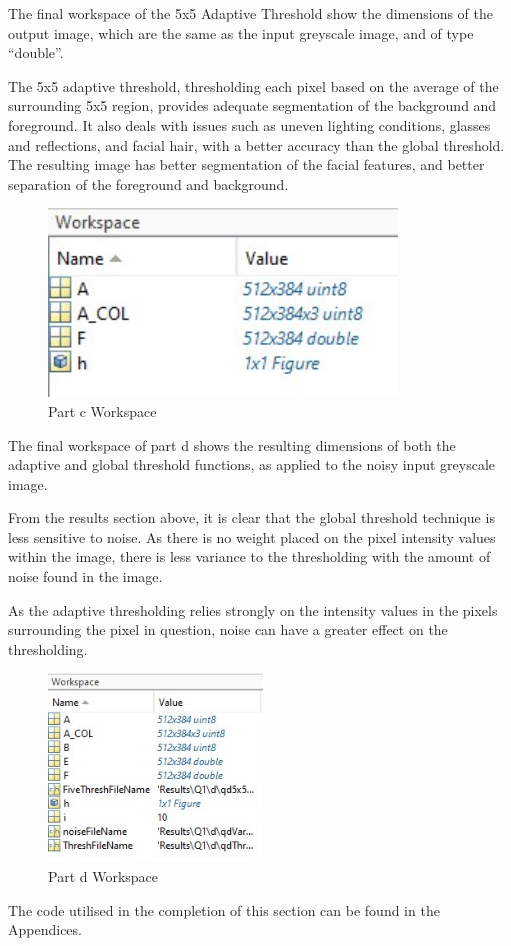 \documentclass[a4paper]{article}
\begin{document}
	\par The final workspace of the 5x5 Adaptive Threshold show the
	dimensions of the output image, which are the same as the input
	greyscale image, and of type ``double''.
	\par The 5x5 adaptive threshold, thresholding each pixel based on the
	average of the surrounding 5x5 region, provides adequate segmentation of
	the background and foreground. It also deals with issues such as uneven
	lighting conditions, glasses and reflections, and facial hair, with a
	better accuracy than the global threshold. The resulting image has
	better segmentation of the facial features, and better separation of the
	foreground and background.
	\begin{figure}[H]
		\centering
		\includegraphics[height=5cm]{Results/Q1/c/Workspace.jpg}%
		\caption{Part c Workspace}
		\label{fig:}
	\end{figure}
	\par The final workspace of part d shows the resulting dimensions of
	both the adaptive and global threshold functions, as applied to the
	noisy input greyscale image.
	\par From the results section above, it is clear that the global
	threshold technique is less sensitive to noise. As there is no weight
	placed on the pixel intensity values within the image, there is less
	variance to the thresholding with the amount of noise found in the image.
	\par As the adaptive thresholding relies strongly on the intensity
	values in the pixels surrounding the pixel in question, noise can have a
	greater effect on the thresholding.
	\begin{figure}[H]
		\centering
		\includegraphics[height=5cm]{Results/Q1/d/Workspace.jpg}%
		\caption{Part d Workspace}
		\label{fig:}
	\end{figure}
	The code utilised in the completion of this section can be found in the
	Appendices.
\end{document}
